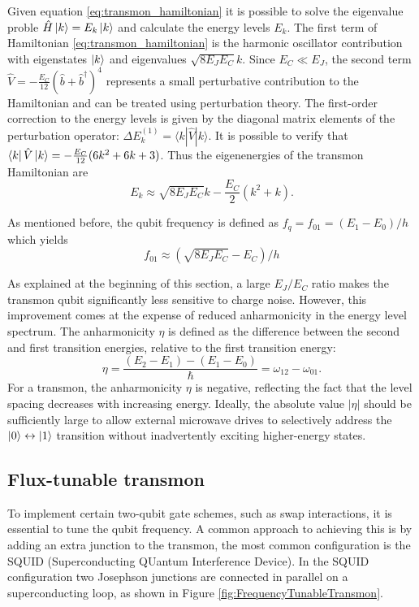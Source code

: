 Given equation \ref{eq:transmon_hamiltonian} it is possible to solve the eigenvalue proble $\hat{H}\ket{k}=E_k\ket{k}$ and calculate the energy levels $E_k$.
The first term of Hamiltonian \ref{eq:transmon_hamiltonian} is the harmonic oscillator contribution with eigenstates $\ket{k}$ and eigenvalues $\sqrt{8E_JE_C}k$. 
Since $E_C \ll E_J$, the second term $ \hat{V} = -\frac{E_C}{12}(\hat{b} + \hat{b}^\dagger)^4$ represents a small perturbative contribution to the Hamiltonian and can be treated using perturbation theory. 
The first-order correction to the energy levels is given by the diagonal matrix elements of the perturbation operator: $\Delta E_k^{(1)} = \langle k | \hat{V} | k \rangle$.
It is possible to verify that $\bra{k} \hat{V} \ket{k} = -\frac{E_C}{12} (6k^2 + 6k + 3)$. 
Thus the eigenenergies of the transmon Hamiltonian are 
\begin{equation}
    E_k \approx \sqrt{8E_JE_C}k - \frac{E_C}{2}(k^2 + k).
\end{equation}

As mentioned before, the qubit frequency is defined as $f_q = f_{01} = (E_1 - E_0)/h$ which yields
\begin{equation}
    f_01 \approx (\sqrt{8E_JE_C} - E_C)/h
\end{equation}

As explained at the beginning of this section, a large $E_J/E_C$ ratio makes the transmon qubit significantly less sensitive to charge noise. 
However, this improvement comes at the expense of reduced anharmonicity in the energy level spectrum. 
The anharmonicity $\eta$ is defined as the difference between the second and first transition energies, relative to the first transition energy:
\begin{equation}
    \eta = \frac{(E_2 - E_1) - (E_1 - E_0)}{\hbar} = \omega_{12} - \omega_{01}.
\end{equation}
For a transmon, the anharmonicity $\eta$ is negative, reflecting the fact that the level spacing decreases with increasing energy. 
Ideally, the absolute value  $|\eta|$ should be sufficiently large to allow external microwave drives to selectively address the $\ket{0}\leftrightarrow\ket{1}$ transition without inadvertently exciting higher-energy states.


\subsection{Flux-tunable transmon}\label{subsec:flux_tunable_transmon}
To implement certain two-qubit gate schemes, such as swap interactions, it is essential to tune the qubit frequency. 
A common approach to achieving this is by adding an extra junction to the transmon, the most common configuration is the SQUID (Superconducting QUantum Interference Device).
In the SQUID configuration two Josephson junctions are connected in parallel on a superconducting loop, as shown in Figure \ref{fig:FrequencyTunableTransmon}.

